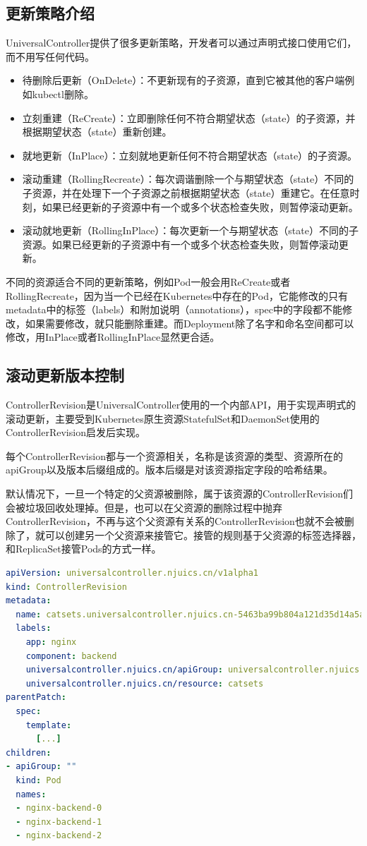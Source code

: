 \documentclass[macfonts,master]{njuthesis}
\begin{document}
\subsection{更新策略介绍}
UniversalController提供了很多更新策略，开发者可以通过声明式接口使用它们，而不用写任何代码。
\begin{itemize}
	\item 待删除后更新（OnDelete）：不更新现有的子资源，直到它被其他的客户端例如kubectl删除。
	\item 立刻重建（ReCreate）：立即删除任何不符合期望状态（state）的子资源，并根据期望状态（state）重新创建。
	\item 就地更新（InPlace）：立刻就地更新任何不符合期望状态（state）的子资源。
	\item 滚动重建（RollingRecreate）：每次调谐删除一个与期望状态（state）不同的子资源，并在处理下一个子资源之前根据期望状态（state）重建它。在任意时刻，如果已经更新的子资源中有一个或多个状态检查失败，则暂停滚动更新。
	\item 滚动就地更新（RollingInPlace）：每次更新一个与期望状态（state）不同的子资源。如果已经更新的子资源中有一个或多个状态检查失败，则暂停滚动更新。
\end{itemize}

不同的资源适合不同的更新策略，例如Pod一般会用ReCreate或者RollingRecreate，因为当一个已经在Kubernetes中存在的Pod，它能修改的只有metadata中的标签（labels）和附加说明（annotations），spec中的字段都不能修改，如果需要修改，就只能删除重建。而Deployment除了名字和命名空间都可以修改，用InPlace或者RollingInPlace显然更合适。

\subsection{滚动更新版本控制}\label{section:rolling-control}
ControllerRevision是UniversalController使用的一个内部API，用于实现声明式的滚动更新，主要受到Kubernetes原生资源StatefulSet和DaemonSet使用的ControllerRevision启发后实现。

每个ControllerRevision都与一个资源相关，名称是该资源的类型、资源所在的apiGroup以及版本后缀组成的。版本后缀是对该资源指定字段的哈希结果。

默认情况下，一旦一个特定的父资源被删除，属于该资源的ControllerRevision们会被垃圾回收处理掉。但是，也可以在父资源的删除过程中抛弃ControllerRevision，不再与这个父资源有关系的ControllerRevision也就不会被删除了，就可以创建另一个父资源来接管它。接管的规则基于父资源的标签选择器，和ReplicaSet接管Pods的方式一样。

\begin{lstlisting}[language=yaml,caption=ControllerRevision示例,label=listing:controllerrevision]
apiVersion: universalcontroller.njuics.cn/v1alpha1
kind: ControllerRevision
metadata:
  name: catsets.universalcontroller.njuics.cn-5463ba99b804a121d35d14a5ab74546d1e8ba953
  labels:
    app: nginx
    component: backend
    universalcontroller.njuics.cn/apiGroup: universalcontroller.njuics.cn
    universalcontroller.njuics.cn/resource: catsets
parentPatch:
  spec:
    template:
      [...]
children:
- apiGroup: ""
  kind: Pod
  names:
  - nginx-backend-0
  - nginx-backend-1
  - nginx-backend-2
\end{lstlisting}
\end{document}
